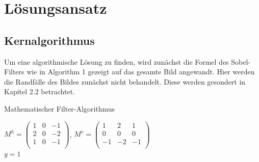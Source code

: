 \documentclass[course=asp]{aspdoc}
\begin{document}
\section{Lösungsansatz}
\subsection{Kernalgorithmus}
Um eine algorithmische Lösung zu finden, wird zunächst die Formel des Sobel-Filters wie in Algorithm 1 gezeigt auf das gesamte Bild angewandt. Hier werden die Randfälle des Bildes zunächst nicht behandelt. Diese werden gesondert in Kapitel 2.2 betrachtet.\\

\begin{algorithm}[H]
\caption{Mathematischer Filter-Algorithmus}
 $M^h=\left( \begin{array}{rrr}
 1&0&-1\\
 2&0&-2\\
 1&0&-1\\
 \end{array} \right)$, 
 $M^v=\left( \begin{array}{rrr}
 1&2&1\\
 0&0&0\\
 -1&-2&-1\\
 \end{array} \right)$\\
 $y = 1$\\
\end{algorithm}
\end{document}
